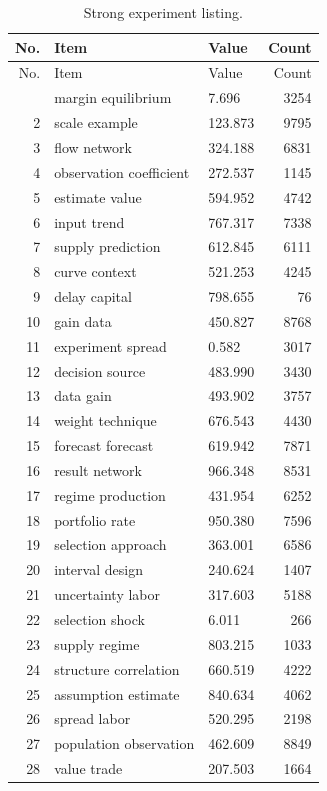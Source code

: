 \documentclass[11pt]{report}
\begin{document}
\begin{longtable}{rllr}\caption{Strong experiment listing.}\label{tab:l9}\\\toprule No. & Item & Value & Count \\ \midrule \endfirsthead\toprule No. & Item & Value & Count \\ \midrule \endhead\bottomrule \endfoot
1 & margin equilibrium & 7.696 & 3254 \\
2 & scale example & 123.873 & 9795 \\
3 & flow network & 324.188 & 6831 \\
4 & observation coefficient & 272.537 & 1145 \\
5 & estimate value & 594.952 & 4742 \\
6 & input trend & 767.317 & 7338 \\
7 & supply prediction & 612.845 & 6111 \\
8 & curve context & 521.253 & 4245 \\
9 & delay capital & 798.655 & 76 \\
10 & gain data & 450.827 & 8768 \\
11 & experiment spread & 0.582 & 3017 \\
12 & decision source & 483.990 & 3430 \\
13 & data gain & 493.902 & 3757 \\
14 & weight technique & 676.543 & 4430 \\
15 & forecast forecast & 619.942 & 7871 \\
16 & result network & 966.348 & 8531 \\
17 & regime production & 431.954 & 6252 \\
18 & portfolio rate & 950.380 & 7596 \\
19 & selection approach & 363.001 & 6586 \\
20 & interval design & 240.624 & 1407 \\
21 & uncertainty labor & 317.603 & 5188 \\
22 & selection shock & 6.011 & 266 \\
23 & supply regime & 803.215 & 1033 \\
24 & structure correlation & 660.519 & 4222 \\
25 & assumption estimate & 840.634 & 4062 \\
26 & spread labor & 520.295 & 2198 \\
27 & population observation & 462.609 & 8849 \\
28 & value trade & 207.503 & 1664 \\

\end{longtable}
\end{document}
